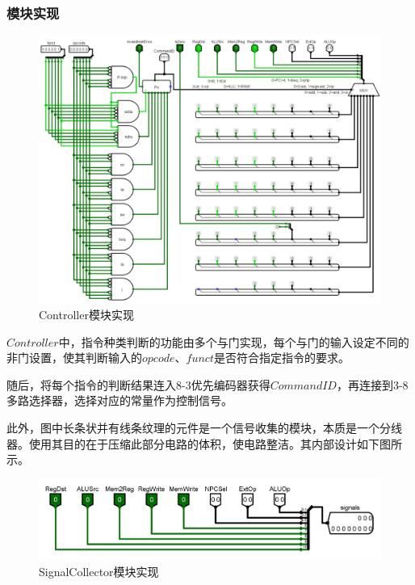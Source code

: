 \documentclass[main.tex]{subfiles}
\begin{document}
\subsubsection{模块实现}
\begin{figure}[h]
\centering
\includegraphics[width=\textwidth]{images/Controller-circuit.png}
\caption{Controller模块实现}
\end{figure}
$Controller$中，指令种类判断的功能由多个与门实现，每个与门的输入设定不同的非门设置，使其判断输入的$opcode$、$funct$是否符合指定指令的要求。

随后，将每个指令的判断结果连入8-3优先编码器获得$CommandID$，再连接到3-8多路选择器，选择对应的常量作为控制信号。

此外，图中长条状并有线条纹理的元件是一个信号收集的模块，本质是一个分线器。使用其目的在于压缩此部分电路的体积，使电路整洁。其内部设计如下图所示。

\begin{figure}[h]
\centering
\includegraphics[width=\textwidth]{images/SignalCollector-circuit.png}
\caption{SignalCollector模块实现}
\end{figure}
\end{document}

